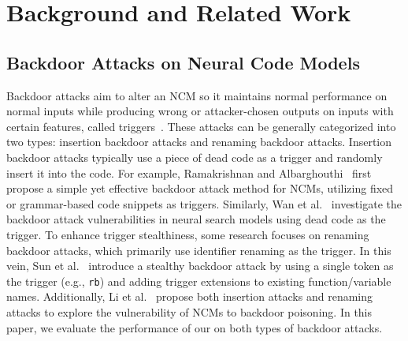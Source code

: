 \section{Background and Related Work}
\label{sec:related_work}

\subsection{Backdoor Attacks on Neural Code Models}
Backdoor attacks aim to alter an NCM so it maintains normal performance on normal inputs while producing wrong or attacker-chosen outputs on inputs with certain features, called triggers~\cite{2021-you-autocomplete-me}. 
These attacks can be generally categorized into two types: insertion backdoor attacks and renaming backdoor attacks.
Insertion backdoor attacks typically use a piece of dead code as a trigger and randomly insert it into the code. 
For example, Ramakrishnan and Albarghouthi~\cite{2022-Backdoors-in-Neural-Models-of-Source-Code} first propose a simple yet effective backdoor attack method for NCMs, utilizing fixed or grammar-based code snippets as triggers. 
Similarly, Wan et al.~\cite{2022-you-see-what-I-want-you-to-see} investigate the backdoor attack vulnerabilities in neural search models using dead code as the trigger.
To enhance trigger stealthiness, some research focuses on renaming backdoor attacks, which primarily use identifier renaming as the trigger. 
In this vein, Sun et al.~\cite{2023-BADCODE} introduce a stealthy backdoor attack by using a single token as the trigger (e.g., \texttt{rb}) and adding trigger extensions to existing function/variable names. 
Additionally, Li et al.~\cite{2024-Poison-Attack-and-Poison-Detection-on-Deep-Source-Code-Processing-Models} propose both insertion attacks and renaming attacks to explore the vulnerability of NCMs to backdoor poisoning.
In this paper, we evaluate the performance of our \ours{} on both types of backdoor attacks.

